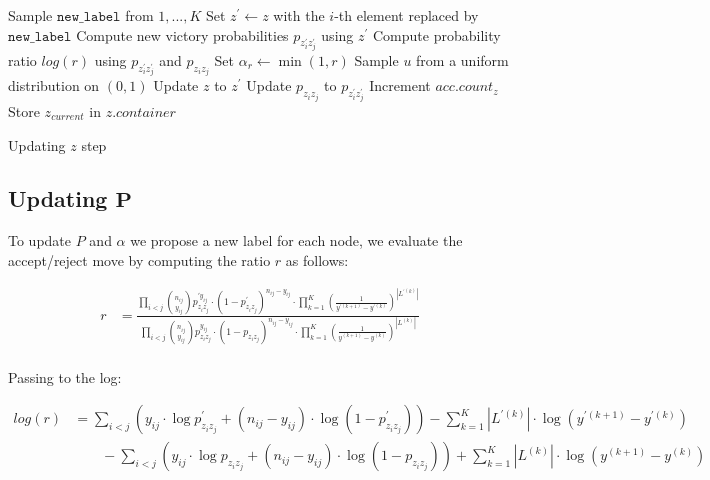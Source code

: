 \documentclass[11pt]{amsart}
\begin{document}
\begin{algorithm}
\begin{algorithmic}[1]
\State Sample $\texttt{new\_label}$ from $1,...,K$
\State Set $z^{\prime} \gets z$ with the $i$-th element replaced by $\texttt{new\_label}$
\State Compute new victory probabilities $p_{z^{\prime}_i z^{\prime}_j}$ using $z^{\prime}$
\State Compute probability ratio $log(r)$  using $p_{z^{\prime}_i z^{\prime}_j}$ and $p_{z_i z_j}$
\State Set $\alpha_{r} \gets \min(1, r)$
\State Sample $u$ from a uniform distribution on $(0,1)$
\State Update $z$ to $z^{\prime}$
\State Update $p_{z_iz_j}$ to $p_{z^{\prime}_i z^{\prime}_j}$
\State Increment $acc.count_{z}$
\EndIf
\State Store $z_{current}$ in $z.container$
\EndFor
\end{algorithmic}
\label{alg:z_update}
\caption{Updating $z$ step}
\end{algorithm}


\subsection{Updating $\mathbf{P}$}


To update $P$ and $\alpha$ we propose a new label for each node, we evaluate the accept/reject move by computing the ratio $r$ as follows:

\begin{align}
r &= \frac{\prod_{i<j}\binom{n_{ij}}{y_{ij}}p_{z_i z_j}^{\prime y_{ij}} \cdot (1 - p^{\prime}_{z_i z_j})^{n_{ij} - y_{ij}} \cdot \prod_{k=1}^K  \left( \frac{1}{y^{\prime (k+1)} - y^{\prime(k)}}\right)^{|L^{\prime(k)}|}}{\prod_{i<j}\binom{n_{ij}}{y_{ij}}p_{z_i z_j}^{y_{ij}} \cdot (1 - p_{z_i z_j})^{n_{ij} - y_{ij}} \cdot \prod_{k=1}^K  \left( \frac{1}{y^{(k+1)} - y^{(k)}}\right)^{|L^{(k)}|}} \\
\end{align}


Passing to the log:

\begin{align}
log(r) &= \sum_{i<j} \left(  y_{ij} \cdot \log{ p^{\prime}_{z_i z_j} } + (n_{ij} - y_{ij}) \cdot \log{ (1 - p^{\prime}_{z_i z_j}) } \right)  - \sum_{k=1}^K |L^{\prime(k)}| \cdot \log{\left( y^{\prime(k+1)} - y^{\prime(k)} \right)}\\
 &\qquad - \sum_{i<j} \left(  y_{ij} \cdot \log{ p_{z_i z_j} } + (n_{ij} - y_{ij}) \cdot \log{ (1 - p_{z_i z_j}) } \right)  + \sum_{k=1}^K |L^{(k)}| \cdot \log{\left( y^{(k+1)} - y^{(k)} \right) }
\end{align}
\end{document}
